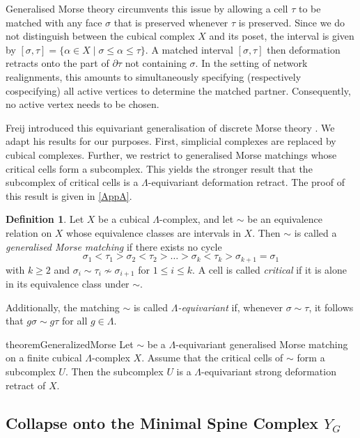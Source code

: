 \documentclass[reqno,dvipsnames]{amsart}
\theoremstyle{plain}
\numberwithin{equation}{section}
\theoremstyle{definition}
\newtheorem{definition}[theorem]{Definition}
\begin{document}
Generalised Morse theory circumvents this issue by allowing a cell $\tau$ to be matched with any face $\sigma$ that is preserved whenever $\tau$ is preserved. Since we do not distinguish between the cubical complex $X$ and its poset, the interval is given by $[\sigma,\tau] = \{\alpha\in X\mid \sigma\leq \alpha\leq \tau\}$. A matched interval $[\sigma, \tau]$ then deformation retracts onto the part of $\partial \tau$ not containing $\sigma$. In the setting of network realignments, this amounts to simultaneously specifying (respectively cospecifying) all active vertices to determine the matched partner. Consequently, no active vertex needs to be chosen.

Freij introduced this equivariant generalisation of discrete Morse theory \cite{Freij}. We adapt his results for our purposes. First, simplicial complexes are replaced by cubical complexes. Further, we restrict to generalised Morse matchings whose critical cells form a subcomplex. This yields the stronger result that the subcomplex of critical cells is a $\Lambda$-equivariant deformation retract. The proof of this result is given in \autoref{AppA}.

\begin{definition}
	Let $X$ be a cubical $\Lambda$-complex, and let $\sim$ be an equivalence relation on $X$ whose equivalence classes are intervals in $X$. Then $\sim$ is called a \textit{generalised Morse matching} if there exists no cycle
	\[
	\sigma_1 < \tau_1 > \sigma_2 < \tau_2 > \ldots > \sigma_k < \tau_k > \sigma_{k+1} = \sigma_1
	\]
	with $k\geq 2$ and $\sigma_i \sim \tau_i \nsim \sigma_{i+1}$ for $1\leq i\leq k$. A cell is called \textit{critical} if it is alone in its equivalence class under $\sim$.
	
	Additionally, the matching $\sim$ is called \textit{$\Lambda$-equivariant} if, whenever $\sigma \sim \tau$, it follows that $g\sigma \sim g\tau$ for all $g\in \Lambda$.
\end{definition}

\begin{restatable}{theorem}{GeneralizedMorse} \label{Freij-generalization}
	Let $\sim$ be a $\Lambda$-equivariant generalised Morse matching on a finite cubical $\Lambda$-complex $X$. Assume that the critical cells of $\sim$ form a subcomplex $U$. Then the subcomplex $U$ is a $\Lambda$-equivariant strong deformation retract of $X$.
\end{restatable}



\subsection{Collapse onto the Minimal Spine Complex \texorpdfstring{$Y_G$}{YG}} \label{sec:MinimalSpineComplex}
\end{document}
